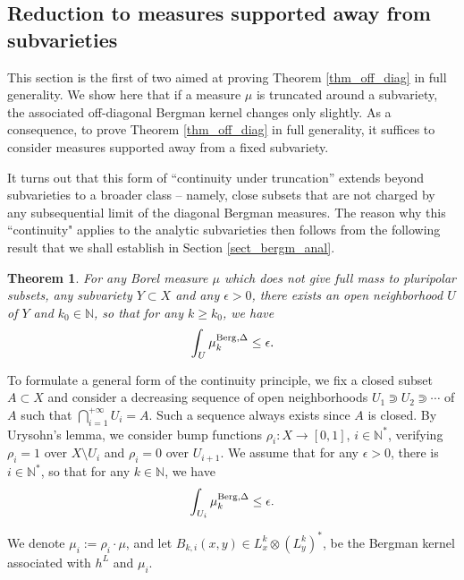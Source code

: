 \documentclass[12pt]{article}
\numberwithin{equation}{section}
\theoremstyle{theorem}
\newtheorem{thm}{Theorem}[section]
\theoremstyle{definition}
\theoremstyle{remark}
\newcommand{\nat}{\mathbb{N}}
\begin{document}
	\subsection{Reduction to measures supported away from subvarieties}\label{sect_local}
	This section is the first of two aimed at proving Theorem \ref{thm_off_diag} in full generality.
	We show here that if a measure $\mu$ is truncated around a subvariety, the associated off-diagonal Bergman kernel changes only slightly.
	As a consequence, to prove Theorem \ref{thm_off_diag} in full generality, it suffices to consider measures supported away from a fixed subvariety.
	\par 
	It turns out that this form of “continuity under truncation” extends beyond subvarieties to a broader class -- namely, close subsets that are not charged by any subsequential limit of the diagonal Bergman measures.
	The reason why this “continuity" applies to the analytic subvarieties then follows from the following result that we shall establish in Section \ref{sect_bergm_anal}.
	\begin{thm}\label{thm_anal_no_mass}
		For any Borel measure $\mu$ which does not give full mass to pluripolar subsets, any subvariety $Y \subset X$ and any $\epsilon > 0$, there exists an open neighborhood $U$ of $Y$ and $k_0 \in \nat$, so that for any $k \geq k_0$, we have
		\begin{equation}\label{eq_anal_no_mass}
			\int_U \mu_k^{\rm{Berg}, \Delta} \leq \epsilon.
		\end{equation}
	\end{thm}
	\par 
	To formulate a general form of the continuity principle, we fix a closed subset $A \subset X$ and consider a decreasing sequence of open neighborhoods $U_1 \Supset U_2 \Supset \cdots$ of $A$ such that $\bigcap_{i = 1}^{+\infty} U_i = A$. 
	Such a sequence always exists since $A$ is closed.
	By Urysohn's lemma, we consider bump functions $\rho_i : X \to [0, 1]$, $i \in \nat^*$, verifying $\rho_i = 1$ over $X \setminus U_i$ and $\rho_i = 0$ over $U_{i + 1}$. 
	We assume that for any $\epsilon > 0$, there is $i \in \nat^*$, so that for any $k \in \nat$, we have
	\begin{equation}\label{eq_anal_no_mass_a}
		\int_{U_i} \mu_k^{\rm{Berg}, \Delta} \leq \epsilon. 
	\end{equation}
	\par 
	We denote $\mu_i := \rho_i \cdot \mu$, and let $B_{k, i}(x, y) \in L^k_x \otimes (L^k_y)^*$, be the Bergman kernel associated with $h^L$ and $\mu_i$. 
\end{document}
